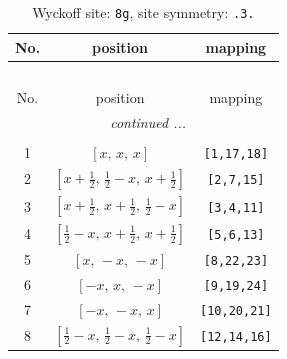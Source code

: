 \documentclass[fleqn,8pt]{jsarticle}
\begin{document}
\renewcommand{\arraystretch}{1.2}
\begin{longtable}{ccc}
\caption{Wyckoff site: {\tt 8g}, site symmetry: {\tt .3.}}
 \\
 \hline \hline
No. & position & mapping \\ \hline \endfirsthead

\multicolumn{2}{l}{\tablename\ \thetable{}} \\
 \hline \hline
No. & position & mapping \\ \hline \endhead

 \hline \hline
\multicolumn{2}{r}{\footnotesize\it continued ...} \\ \endfoot

 \hline \hline
\multicolumn{2}{r}{} \\ \endlastfoot

1 & $\left[ x,\, x,\, x \right]$ & {\tt [1,17,18]} \\ \hline
2 & $\left[ x + \frac{1}{2},\, \frac{1}{2} - x,\, x + \frac{1}{2} \right]$ & {\tt [2,7,15]} \\ \hline
3 & $\left[ x + \frac{1}{2},\, x + \frac{1}{2},\, \frac{1}{2} - x \right]$ & {\tt [3,4,11]} \\ \hline
4 & $\left[ \frac{1}{2} - x,\, x + \frac{1}{2},\, x + \frac{1}{2} \right]$ & {\tt [5,6,13]} \\ \hline
5 & $\left[ x,\, - x,\, - x \right]$ & {\tt [8,22,23]} \\ \hline
6 & $\left[ - x,\, x,\, - x \right]$ & {\tt [9,19,24]} \\ \hline
7 & $\left[ - x,\, - x,\, x \right]$ & {\tt [10,20,21]} \\ \hline
8 & $\left[ \frac{1}{2} - x,\, \frac{1}{2} - x,\, \frac{1}{2} - x \right]$ & {\tt [12,14,16]} \\
\end{longtable}
\renewcommand{\arraystretch}{1.2}
\end{document}
